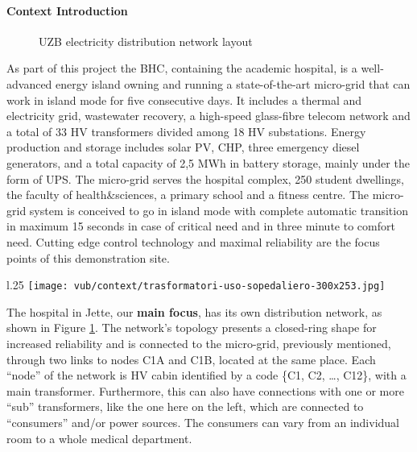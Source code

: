 \paragraph{Context Introduction}
\begin{figure}[ht]
    \caption{\acs{UZB} electricity distribution network layout}
    \label{fig:bhc_site_layout}
\end{figure}
As part of this project the \ac{BHC}, containing the academic hospital, is a well-advanced
energy island owning and running a state-of-the-art micro-grid that can work in island mode for five consecutive days.
It includes a thermal and electricity grid, wastewater recovery, a high-speed glass-fibre telecom network and a total of 33 \ac{HV} transformers divided among 18 \ac{HV} substations.
Energy production and storage includes solar PV, \ac{CHP}, three emergency diesel generators,
and a total capacity of 2,5 MWh in battery storage, mainly under the form of UPS.
The micro-grid serves the hospital complex, 250 student dwellings, the faculty of health\&sciences, a primary school and a fitness centre. 
The micro-grid system is conceived to go in island mode with complete automatic transition in maximum 15 seconds in case of critical need and in three minute to comfort need. 
Cutting edge control technology and maximal reliability are the focus points of this demonstration site.

\begin{wrapfigure}{l}{.25\textwidth}
    \centering
    \texttt{[image: vub/context/trasformatori-uso-sopedaliero-300x253.jpg]}
\end{wrapfigure}
The hospital in Jette, our \textbf{main focus}, has its own distribution network, as shown in Figure \ref{fig:bhc_site_layout}.
The network's topology presents a closed-ring shape for increased reliability and is connected to the micro-grid, previously mentioned,  
through two links to nodes C1A and C1B, located at the same place. Each ``node'' of the network is \ac{HV} cabin identified by a code \{C1, C2, \dots, C12\}, with a main transformer.
Furthermore, this  can also have connections with one or more ``sub'' transformers, like the one here on the left, 
which are connected to ``consumers'' and/or power sources. The consumers can vary from an individual room to a whole medical department.


